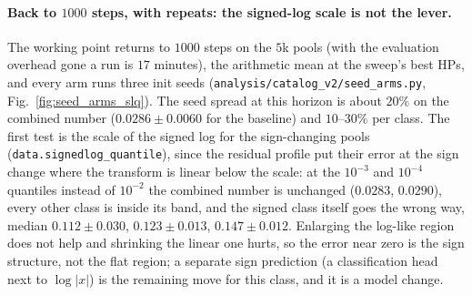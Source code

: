 \documentclass[11pt]{article}
\newcommand{\code}[1]{\texttt{#1}}
\begin{document}
\paragraph{Back to $1000$ steps, with repeats: the signed-log scale is not the lever.}
The working point returns to $1000$ steps on the $5$k pools (with the evaluation overhead
gone a run is $17$ minutes), the arithmetic mean at the sweep's best HPs, and every arm
runs three init seeds (\code{analysis/catalog\_v2/seed\_arms.py}, Fig.~\ref{fig:seed_arms_slq}).
The seed spread at this horizon is about $20\%$ on the combined number ($0.0286\pm0.0060$
for the baseline) and $10$--$30\%$ per class. The first test is the scale of the signed log
for the sign-changing pools (\code{data.signedlog\_quantile}), since the residual profile put
their error at the sign change where the transform is linear below the scale: at the $10^{-3}$
and $10^{-4}$ quantiles instead of $10^{-2}$ the combined number is unchanged ($0.0283$,
$0.0290$), every other class is inside its band, and the signed class itself goes the wrong
way, median $0.112\pm0.030$, $0.123\pm0.013$, $0.147\pm0.012$. Enlarging the log-like region
does not help and shrinking the linear one hurts, so the error near zero is the sign
structure, not the flat region; a separate sign prediction (a classification head next to
$\log|x|$) is the remaining move for this class, and it is a model change.
\end{document}
